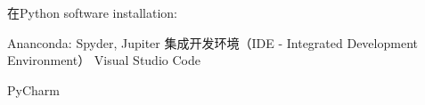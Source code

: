 \documentclass[main.tex]{subfiles}
\begin{document}
在Python software installation:

Ananconda: Spyder, Jupiter
集成开发环境（IDE - Integrated Development Environment）
Visual Studio Code

PyCharm

\newpage
\end{document}
